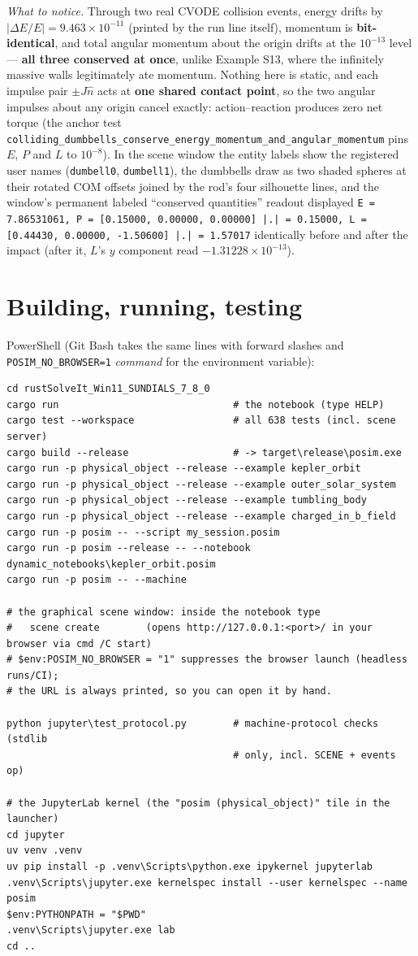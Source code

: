 \documentclass[11pt]{article}
\newcommand{\code}[1]{\texttt{#1}}
\begin{document}
\emph{What to notice.} Through two real CVODE collision events, energy
drifts by $|\Delta E/E| = 9.463\times10^{-11}$ (printed by the run line
itself), momentum is \textbf{bit-identical}, and total angular momentum
about the origin drifts at the $10^{-13}$ level --- \textbf{all three
conserved at once}, unlike Example S13, where the infinitely massive
walls legitimately ate momentum. Nothing here is static, and each
impulse pair $\pm J\hat n$ acts at \textbf{one shared contact point}, so
the two angular impulses about any origin cancel exactly:
action--reaction produces zero net torque (the anchor test
\code{colliding\_dumbbells\_conserve\_energy\_momentum\_and\_angular\_momentum}
pins $E$, $P$ and $L$ to $10^{-8}$). In the scene window the entity
labels show the registered user names (\code{dumbell0},
\code{dumbell1}), the dumbbells draw as two shaded spheres at their
rotated COM offsets joined by the rod's four silhouette lines, and the
window's permanent labeled ``conserved quantities'' readout displayed
\code{E = 7.86531061, P = [0.15000, 0.00000, 0.00000] |.| = 0.15000,
L = [0.44430, 0.00000, -1.50600] |.| = 1.57017} identically before and
after the impact (after it, $L$'s $y$ component read
$-1.31228\times10^{-13}$).

\section{Building, running, testing}

PowerShell (Git Bash takes the same lines with forward slashes and
\code{POSIM\_NO\_BROWSER=1} \textit{command} for the environment
variable):

\begin{lstlisting}
cd rustSolveIt_Win11_SUNDIALS_7_8_0
cargo run                              # the notebook (type HELP)
cargo test --workspace                 # all 638 tests (incl. scene server)
cargo build --release                  # -> target\release\posim.exe
cargo run -p physical_object --release --example kepler_orbit
cargo run -p physical_object --release --example outer_solar_system
cargo run -p physical_object --release --example tumbling_body
cargo run -p physical_object --release --example charged_in_b_field
cargo run -p posim -- --script my_session.posim
cargo run -p posim --release -- --notebook dynamic_notebooks\kepler_orbit.posim
cargo run -p posim -- --machine

# the graphical scene window: inside the notebook type
#   scene create        (opens http://127.0.0.1:<port>/ in your browser via cmd /C start)
# $env:POSIM_NO_BROWSER = "1" suppresses the browser launch (headless runs/CI);
# the URL is always printed, so you can open it by hand.

python jupyter\test_protocol.py        # machine-protocol checks (stdlib
                                       # only, incl. SCENE + events op)

# the JupyterLab kernel (the "posim (physical_object)" tile in the launcher)
cd jupyter
uv venv .venv
uv pip install -p .venv\Scripts\python.exe ipykernel jupyterlab
.venv\Scripts\jupyter.exe kernelspec install --user kernelspec --name posim
$env:PYTHONPATH = "$PWD"
.venv\Scripts\jupyter.exe lab
cd ..
\end{lstlisting}
\end{document}
